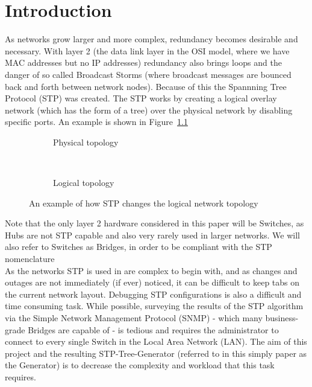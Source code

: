 \chapter{Introduction}
As networks grow larger and more complex, redundancy becomes desirable and necessary.
With layer 2 (the data link layer in the OSI model, where we have MAC addresses but no IP addresses) redundancy also brings loops and the danger of so called Broadcast Storms (where broadcast messages are bounced back and forth between network nodes).
Because of this the Spannning Tree Protocol (STP)\cite{perlman85} was created.
The STP works by creating a logical overlay network (which has the form of a tree) over the physical network by disabling specific ports.
An example is shown in Figure~\ref{fig:stp_example}

\begin{figure}[h]
    \begin{center}
    \begin{subfigure}[b]{0.4\textwidth}
    \caption{Physical topology}
    \end{subfigure}
    ~
    \begin{subfigure}[b]{0.4\textwidth}
    \caption{Logical topology}
    \end{subfigure}
    \end{center}
    \caption{An example of how STP changes the logical network topology}
    \label{fig:stp_example}
\end{figure}

Note that the only layer 2 hardware considered in this paper will be Switches, as Hubs are not STP capable and also very rarely used in larger networks.
We will also refer to Switches as Bridges, in order to be compliant with the STP nomenclature\\

As the networks STP is used in are complex to begin with, and as changes and outages are not immediately (if ever) noticed, it can be difficult to keep tabs on the current network layout.
Debugging STP configurations is also a difficult and time consuming task.
While possible, surveying the results of the STP algorithm via the Simple Network Management Protocol (SNMP) - which many business-grade Bridges are capable of - is tedious and requires the administrator to connect to every single Switch in the Local Area Network (LAN).
The aim of this project and the resulting STP-Tree-Generator (referred to in this simply paper as the Generator) is to decrease the complexity and workload that this task requires.\\

